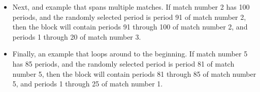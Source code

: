 \documentclass[11pt]{article}
\newcommand{\dblbkt}[1]{}
\begin{document}
\begin{itemize}
\begin{itemize}
\begin{itemize}
    \item Next, and example that spans multiple matches.  \dblbkt{1} If match number 2 has 100 periods, and the randomly selected period is period 91 of match number 2, \dblbkt{1} then the block will contain periods 91 through 100 of match number 2, and periods 1 through 20 of match number 3.
    \item Finally, an example that loops around to the beginning.  \dblbkt{1} If match number 5 has 85 periods, and the randomly selected period is period 81 of match number 5, \dblbkt{1} then the block will contain periods 81 through 85 of match number 5, and periods 1 through 25 of match number 1.
  \end{itemize} 
\end{itemize} 
\end{itemize} 

\end{document}
